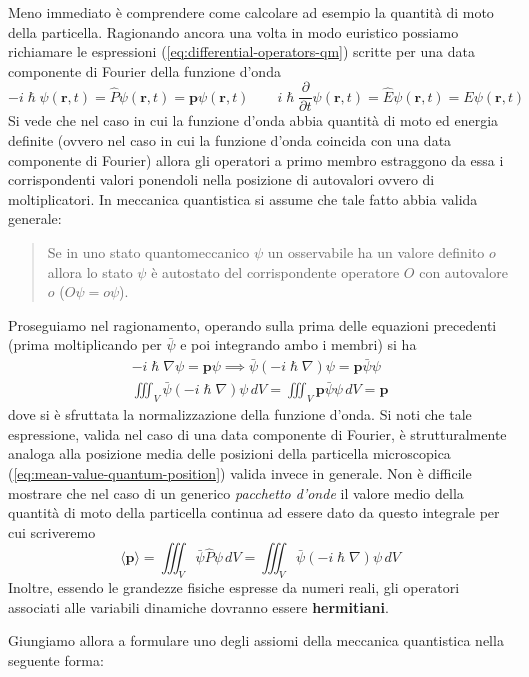 Meno immediato è comprendere come calcolare ad esempio la quantità di
moto della particella.
Ragionando ancora una volta in modo euristico
possiamo richiamare le espressioni (\ref{eq:differential-operators-qm}) scritte per
una data componente di Fourier della funzione d'onda
\[
    - i \hslash \psi(\bm{r},t) = \hat{P} \psi(\bm{r},t) = \bm{p} \psi(\bm{r},t) \qquad
    i \hslash \frac{\partial}{\partial t} \psi(\bm{r},t) = \hat{E}\psi(\bm{r},t)= E\psi(\bm{r},t)
\] Si vede che nel caso in cui la funzione d'onda abbia quantità di moto
ed energia definite (ovvero nel caso in cui la funzione d'onda coincida
con una data componente di Fourier) allora gli operatori a primo membro
estraggono da essa i corrispondenti valori ponendoli nella posizione di
autovalori ovvero di moltiplicatori.
In meccanica quantistica si assume
che tale fatto abbia valida generale:
\begin{quote}
    Se in uno stato quantomeccanico \(\psi\) un osservabile ha un valore
    definito \(o\) allora lo stato \(\psi\) è autostato del corrispondente
    operatore \(O\) con autovalore \(o\) (\(O \psi = o \psi\)).
\end{quote}

Proseguiamo nel ragionamento, operando sulla prima delle equazioni
precedenti (prima moltiplicando per \(\bar{\psi}\) e poi integrando ambo i
membri) si ha
\begin{gather*}
    - i \hslash \nabla \psi = \bm{p} \psi \implies
    \bar{\psi}(-i \hslash \nabla) \psi = \bm{p} \bar{\psi}\psi\\
    \iiint_{V} \bar{\psi}(-i \hslash \nabla) \psi \, dV = \iiint_{V} \bm{p} \bar{\psi}\psi \, dV = \bm{p}
\end{gather*} dove si è sfruttata la normalizzazione della funzione d'onda.
Si noti
che tale espressione, valida nel caso di una data componente di Fourier,
è strutturalmente analoga alla posizione media delle posizioni della
particella microscopica (\ref{eq:mean-value-quantum-position}) valida invece in generale.
Non è difficile mostrare che nel caso di un generico \emph{pacchetto d'onde} il
valore medio della quantità di moto della particella continua ad essere
dato da questo integrale per cui scriveremo
\[
    \langle \bm{p}\rangle = \iiint_{V} \bar{\psi}\hat{P}\psi \, dV = \iiint_{V} \bar{\psi}(- i \hslash \nabla )\psi \, dV
\] Inoltre, essendo le grandezze fisiche espresse da numeri reali, gli
operatori associati alle variabili dinamiche dovranno essere
\textbf{hermitiani}.

Giungiamo allora a formulare uno degli assiomi della meccanica
quantistica nella seguente forma:

